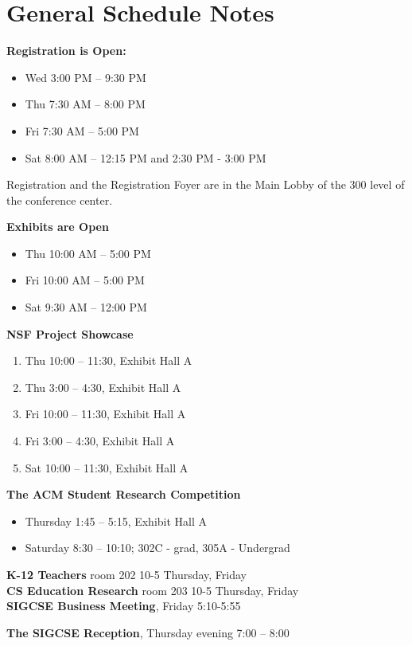 \newpage
{\centering
\section*{General Schedule Notes}
}

\noindent
\textbf{Registration is Open:}
\begin{itemize}
	\item Wed 3:00 PM -- 9:30 PM
	\item Thu 7:30 AM -- 8:00 PM
	\item Fri 7:30 AM -- 5:00 PM
	\item Sat 8:00 AM -- 12:15 PM and 2:30 PM - 3:00 PM
\end{itemize}
\noindent Registration and the Registration Foyer are in the Main Lobby of the 300 level of the conference center.

\vspace{0.5\baselineskip}
\noindent
\textbf{Exhibits are Open }
\begin{itemize}
\item Thu 10:00 AM -- 5:00 PM
\item Fri 10:00 AM -- 5:00 PM
\item Sat 9:30 AM -- 12:00 PM
\end{itemize}

\noindent
\textbf{NSF Project Showcase}
\begin{enumerate}
\item Thu 10:00 -- 11:30, Exhibit Hall A
\item Thu 3:00 -- 4:30, Exhibit Hall A
\item Fri 10:00 -- 11:30, Exhibit Hall A
\item Fri 3:00 -- 4:30, Exhibit Hall A
\item Sat 10:00 -- 11:30, Exhibit Hall A
\end{enumerate}

\noindent
\textbf{The ACM Student Research Competition}
\begin{itemize}
	\item Thursday 1:45 -- 5:15, Exhibit Hall A
	\item Saturday 8:30 -- 10:10; 302C - grad, 305A - Undergrad
\end{itemize}

\noindent
\textbf{K-12 Teachers} room 202 10-5 Thursday, Friday \\
\textbf{CS Education Research} room 203  10-5 Thursday, Friday \\
\textbf{SIGCSE Business Meeting}, Friday 5:10-5:55

\noindent
\textbf{The SIGCSE Reception}, Thursday evening  7:00 -- 8:00

\newpage